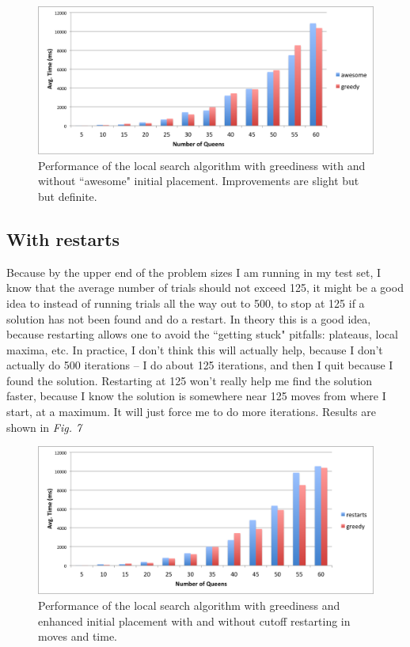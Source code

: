 \documentclass{article}
\begin{document}
\begin{doublespace}
\begin{figure}[ht!]
\centering
\includegraphics[width=6.5in]{./awesome-compared.png}
\caption{Performance of the local search algorithm with greediness with and without ``awesome" initial placement. Improvements are slight but but definite.}
\end{figure}


\subsection{With restarts}
Because by the upper end of the problem sizes I am running in my test set, I know that the average number of trials should not exceed 125, it might be a good idea to instead of running trials all the way out to 500, to stop at 125 if a solution has not been found and do a restart. In theory this is a good idea, because restarting allows one to avoid the ``getting stuck" pitfalls: plateaus, local maxima, etc. In practice, I don't think this will actually help, because I don't actually do 500 iterations -- I do about 125 iterations, and then I quit because I found the solution. Restarting at 125 won't really help me find the solution faster, because I know the solution is somewhere near 125 moves from where I start, at a maximum. It will just force me to do more iterations. Results are shown in \textit{Fig. 7}

\begin{figure}[ht!]
\centering
\includegraphics[width=6.5in]{./restarts.png}
\caption{Performance of the local search algorithm with greediness and enhanced initial placement with and without cutoff restarting in moves and time.}
\end{figure}


\end{doublespace}
\end{document}
